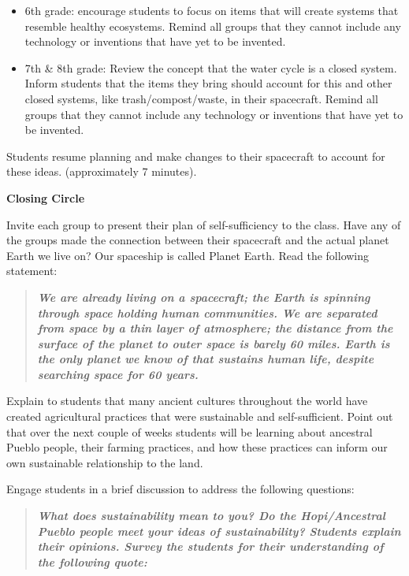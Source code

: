 \documentclass[12pt,]{article}
\providecommand{\tightlist}{%
  \setlength{\itemsep}{0pt}\setlength{\parskip}{0pt}}
\begin{document}
\begin{enumerate}
  \begin{itemize}
  \tightlist
  \item
    6th grade: encourage students to focus on items that will create
    systems that resemble healthy ecosystems. Remind all groups
    that they cannot include any technology or inventions that
    have yet to be invented.
  \item
    7th \& 8th grade: Review the concept that the water cycle is a
    closed system. Inform students that the items they bring
    should account for this and other closed systems, like
    trash/compost/waste, in their spacecraft. Remind all groups
    that they cannot include any technology or inventions that
    have yet to be invented.
  \end{itemize}
\end{enumerate}

Students resume planning and make changes to their spacecraft to account
for these ideas. (approximately 7 minutes).

\textbf{Closing Circle}

Invite each group to present their plan of self-sufficiency to the
class. Have any of the groups made the connection between their
spacecraft and the actual planet Earth we live on? Our spaceship is
called Planet Earth. Read the following statement:

\begin{quote}
\textbf{\emph{We are already living on a spacecraft; the Earth is spinning through
space holding human communities. We are separated from space by a thin
layer of atmosphere; the distance from the surface of the planet to
outer space is barely 60 miles. Earth is the only planet we know of that
sustains human life, despite searching space for 60 years.}}
\end{quote}

Explain to students that many ancient cultures throughout the world have
created agricultural practices that were sustainable and
self-sufficient. Point out that over the next couple of weeks students
will be learning about ancestral Pueblo people, their farming practices,
and how these practices can inform our own sustainable relationship to
the land.

Engage students in a brief discussion to address the following
questions:

\begin{quote}
\textbf{\emph{What does sustainability mean to you? Do the Hopi/Ancestral Pueblo
people meet your ideas of sustainability? Students explain their
opinions. Survey the students for their understanding of the following
quote:}}
\end{quote}
\end{document}
